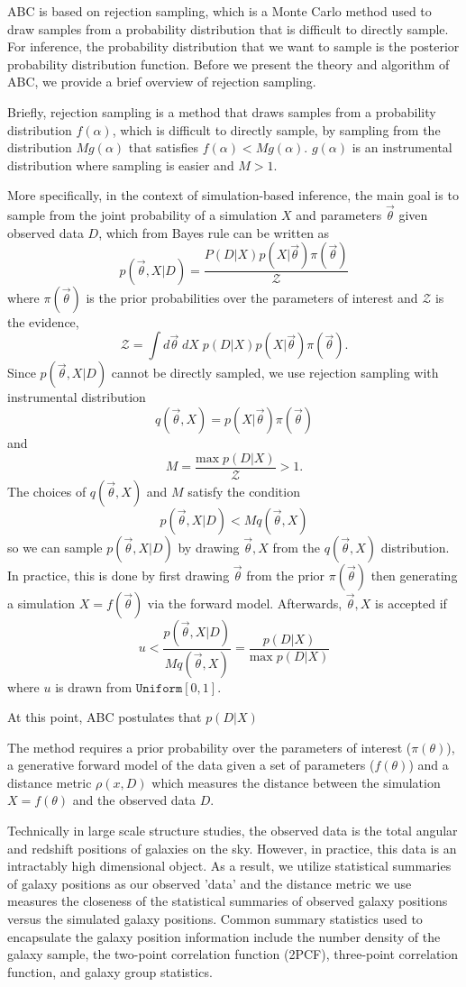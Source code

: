\documentclass[12pt, preprint]{aastex}
\newcommand{\beq}{\begin{equation}}
\newcommand{\eeq}{\end{equation}}
\newcommand{\pars}{\vec{\theta}}
\begin{document}
ABC is based on rejection sampling, which is a Monte Carlo method 
used to draw samples from a probability distribution that is difficult 
to directly sample. For inference, the probability distribution that 
we want to sample is the posterior probability distribution function.  
Before we present the theory and algorithm of ABC, we provide a brief
overview of rejection sampling.  

Briefly, rejection sampling is a method that draws samples from a 
probability distribution $f(\alpha)$, which is difficult to 
directly sample, by sampling from the distribution $M g(\alpha)$ that 
satisfies $f(\alpha) < M g(\alpha)$. $g(\alpha)$ is an instrumental 
distribution where sampling is easier and $M > 1$.

More specifically, in the context of simulation-based inference, 
the main goal is to sample from the joint probability of a
simulation $X$ and parameters $\pars$ given observed data $D$, which 
from Bayes rule can be written as 
\beq
p(\pars, X | D) = \frac{P(D|X)p(X|\pars)\pi(\pars)}{\mathcal{Z}}
\eeq
where $\pi(\pars)$ is the prior probabilities over the parameters of 
interest and $\mathcal{Z}$ is the evidence, 
\beq
\mathcal{Z} = \int d\pars \; dX\; p(D|X) p(X|\pars) \pi(\pars). 
\eeq
Since $p(\pars, X | D)$ cannot be directly sampled, we use rejection 
sampling with instrumental distribution 
\beq
q(\pars, X) = p(X|\pars) \pi(\pars)
\eeq
and 
\beq
M = \frac{\mathrm{max}\; p(D|X)}{\mathcal{Z}} > 1.
\eeq
The choices of $q(\pars, X)$ and $M$ satisfy the condition 
\beq
p(\pars, X | D) < M q(\pars, X)
\eeq
so we can sample $p(\pars, X | D)$ by drawing ${\pars, X}$ from 
the $q(\pars, X)$ distribution. In practice, this is done 
by first drawing $\pars$ from the prior $\pi(\pars)$ then generating a 
simulation $X = f(\pars)$ via the forward model. Afterwards, ${\pars, X}$ 
is accepted if
\beq
u < \frac{p(\pars, X | D)}{M q(\pars, X)} = \frac{p(D|X)}{\mathrm{max}\;p(D|X)}
\eeq
where $u$ is drawn from $\mathtt{Uniform}[0,1]$. 

At this point, ABC postulates that $p(D|X)$ 

The method requires a prior probability over the parameters of interest 
($\pi(\theta)$), a generative forward model of the data given a set of 
parameters ($f(\theta)$) and a distance metric $\rho(x,D)$ which measures 
the distance between the simulation $X = f(\theta)$ and the observed data $D$. 

Technically in large scale structure studies, the observed data is the 
total angular and redshift positions of galaxies on the sky. However, 
in practice, this data is an intractably high dimensional object. As a result, we 
utilize statistical summaries of galaxy positions as our observed 'data' 
and the distance metric we use measures the closeness of the statistical 
summaries of observed galaxy positions versus the simulated galaxy 
positions. Common summary statistics used to encapsulate the galaxy position 
information include the number density of the galaxy sample, the two-point 
correlation function (2PCF), three-point correlation function, and galaxy 
group statistics. 
\end{document}
